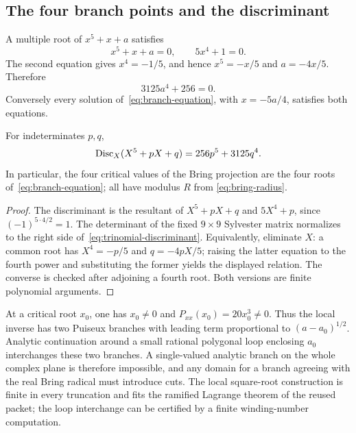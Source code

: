 \subsection{The four branch points and the discriminant}

A multiple root of \(x^5+x+a\) satisfies
\[
 x^5+x+a=0,
 \qquad 5x^4+1=0.
\]
The second equation gives \(x^4=-1/5\), and hence
\(x^5=-x/5\) and \(a=-4x/5\).  Therefore
\begin{equation}\label{eq:branch-equation}
 3125a^4+256=0.
\end{equation}
Conversely every solution of~\eqref{eq:branch-equation}, with
\(x=-5a/4\), satisfies both equations.

\begin{theorem}\label{thm:trinomial-discriminant}
For indeterminates \(p,q\),
\begin{equation}\label{eq:trinomial-discriminant}
 \operatorname{Disc}_X(X^5+pX+q)=256p^5+3125q^4.
\end{equation}
In particular, the four critical values of the Bring projection are the four
roots of~\eqref{eq:branch-equation}; all have modulus \(R\) from
\eqref{eq:bring-radius}.
\end{theorem}

\begin{proof}
The discriminant is the resultant of
\(X^5+pX+q\) and \(5X^4+p\), since
\((-1)^{5\cdot4/2}=1\).  The determinant of the fixed \(9\times9\) Sylvester
matrix normalizes to the right side of~\eqref{eq:trinomial-discriminant}.
Equivalently, eliminate \(X\): a common root has
\(X^4=-p/5\) and
\(q=-4pX/5\); raising the latter equation to the fourth power and substituting
the former yields the displayed relation.  The converse is checked after
adjoining a fourth root.  Both versions are finite polynomial arguments.
\end{proof}

At a critical root \(x_0\), one has \(x_0\ne0\) and
\(P_{xx}(x_0)=20x_0^3\ne0\).  Thus the local inverse has two Puiseux branches
with leading term proportional to \((a-a_0)^{1/2}\).  Analytic continuation
around a small rational polygonal loop enclosing \(a_0\) interchanges these
two branches.  A single-valued analytic branch on the whole complex plane is
therefore impossible, and any domain for a branch agreeing with the real Bring
radical must introduce cuts.  The local square-root construction is finite in
every truncation and fits the ramified Lagrange theorem of the reused packet;
the loop interchange can be certified by a finite winding-number computation.

